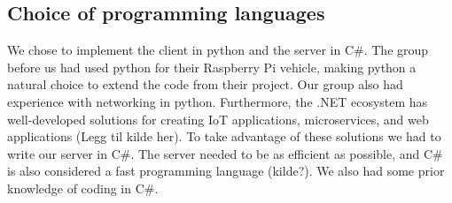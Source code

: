 \subsection{Choice of programming languages}
We chose to implement the client in python and the server in C\#. The group before us had used python for their Raspberry Pi vehicle, making python a natural choice to extend the code from their project. Our group also had experience with networking in python. Furthermore, the .NET ecosystem has well-developed solutions for creating IoT applications, microservices, and web applications (Legg til kilde her). To take advantage of these solutions we had to write our server in C\#. The server needed to be as efficient as possible, and C\# is also considered a fast programming language (kilde?). We also had some prior knowledge of coding in C\#.